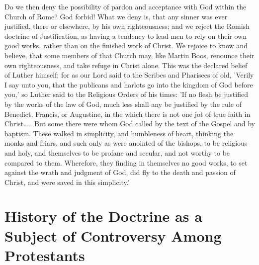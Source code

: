 \documentclass[
]{book}
\begin{document}
Do we then deny the possibility of pardon and acceptance with God within the Church of Rome? God forbid! What we deny is, that any sinner was ever justified, there or elsewhere, by his own righteousness; and we reject the Romish doctrine of Justification, as having a tendency to lead men to rely on their own good works, rather than on the finished work of Christ. We rejoice to know and believe, that some members of that Church may, like Martin Boos, renounce their own righteousness, and take refuge in Christ alone. This was the declared belief of Luther himself; for as our Lord said to the Scribes and Pharisees of old, 'Verily I say unto you, that the publicans and harlots go into the kingdom of God before you,' so Luther said to the Religious Orders of his times: 'If no flesh be justified by the works of the law of God, much less shall any be justified by the rule of Benedict, Francis, or Augustine, in the which there is not one jot of true faith in Christ\ldots.. But some there were whom God called by the text of the Gospel and by baptism. These walked in simplicity, and humbleness of heart, thinking the monks and friars, and such only as were anointed of the bishops, to be religious and holy, and themselves to be profane and secular, and not worthy to be compared to them. Wherefore, they finding in themselves no good works, to set against the wrath and judgment of God, did fly to the death and passion of Christ, and were saved in this simplicity.'

\hypertarget{history-of-the-doctrine-as-a-subject-of-controversy-among-protestants}{%
\chapter{History of the Doctrine as a Subject of Controversy Among Protestants}\label{history-of-the-doctrine-as-a-subject-of-controversy-among-protestants}}
\end{document}
